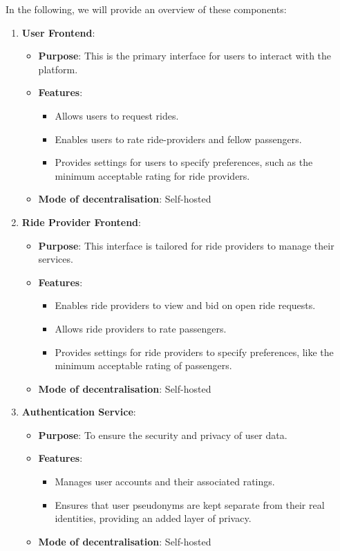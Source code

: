 In the following, we will provide an overview of these components:

\begin{enumerate}
    \item \textbf{User Frontend}:
    \begin{itemize}
        \item \textbf{Purpose}: This is the primary interface for users to interact with the platform.
        \item \textbf{Features}:
        \begin{itemize}
            \item Allows users to request rides.
            \item Enables users to rate ride-providers and fellow passengers.
            \item Provides settings for users to specify preferences, such as the minimum acceptable rating for ride providers.
        \end{itemize}
        \item \textbf{Mode of decentralisation}: Self-hosted 
    \end{itemize}

    \item \textbf{Ride Provider Frontend}:
    \begin{itemize}
        \item \textbf{Purpose}: This interface is tailored for ride providers to manage their services.
        \item \textbf{Features}:
        \begin{itemize}
            \item Enables ride providers to view and bid on open ride requests.
            \item Allows ride providers to rate passengers.
            \item Provides settings for ride providers to specify preferences, like the minimum acceptable rating of passengers.
        \end{itemize}
        \item \textbf{Mode of decentralisation}: Self-hosted 
    \end{itemize}

    \item \textbf{Authentication Service}:
    \begin{itemize}
        \item \textbf{Purpose}: To ensure the security and privacy of user data.
        \item \textbf{Features}:
        \begin{itemize}
            \item Manages user accounts and their associated ratings.
            \item Ensures that user pseudonyms are kept separate from their real identities, providing an added layer of privacy.
        \end{itemize}
        \item \textbf{Mode of decentralisation}: Self-hosted 
    \end{itemize}


\end{enumerate}
